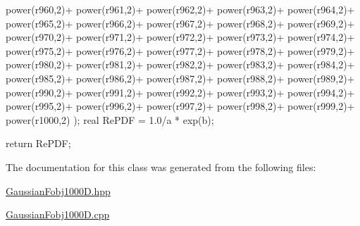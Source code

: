 \begin{DoxyCode}
{    power(r960,2)+
    power(r961,2)+
    power(r962,2)+
    power(r963,2)+
    power(r964,2)+
    power(r965,2)+
    power(r966,2)+
    power(r967,2)+
    power(r968,2)+
    power(r969,2)+
    power(r970,2)+
    power(r971,2)+
    power(r972,2)+
    power(r973,2)+
    power(r974,2)+
    power(r975,2)+
    power(r976,2)+
    power(r977,2)+
    power(r978,2)+
    power(r979,2)+
    power(r980,2)+
    power(r981,2)+
    power(r982,2)+
    power(r983,2)+
    power(r984,2)+
    power(r985,2)+
    power(r986,2)+
    power(r987,2)+
    power(r988,2)+
    power(r989,2)+
    power(r990,2)+
    power(r991,2)+
    power(r992,2)+
    power(r993,2)+
    power(r994,2)+
    power(r995,2)+
    power(r996,2)+
    power(r997,2)+
    power(r998,2)+
    power(r999,2)+
    power(r1000,2)
    );
    real RePDF = 1.0/a * exp(b);
    
    return RePDF;
}
\end{DoxyCode}


\-The documentation for this class was generated from the following files\-:\begin{DoxyCompactItemize}
\item 
\hyperlink{GaussianFobj1000D_8hpp}{\-Gaussian\-Fobj1000\-D.\-hpp}\item 
\hyperlink{GaussianFobj1000D_8cpp}{\-Gaussian\-Fobj1000\-D.\-cpp}\end{DoxyCompactItemize}
